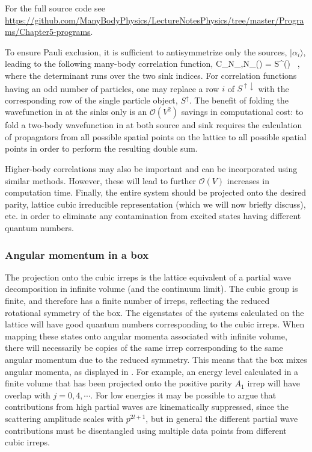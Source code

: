 For the full source code see \url{https://github.com/ManyBodyPhysics/LectureNotesPhysics/tree/master/Programs/Chapter5-programs}.


To ensure Pauli exclusion, it is sufficient to antisymmetrize only the sources, $|\alpha_i \rangle$, leading to the following many-body correlation function,
\beq
C_{N_{\uparrow},N_{\downarrow}}(\tau) = \langle \det S^{\uparrow \downarrow}(\tau) \rangle \ ,
\eeq 
where the determinant runs over the two sink indices. For correlation functions having an odd number of particles, one may replace a row $i$ of $S^{\uparrow\downarrow}$ with the corresponding row of the single particle object, $S^{\uparrow}$. The benefit of folding the wavefunction in at the sinks only is an ${\mathcal{ O}}(V^2)$ savings in computational cost: to fold a two-body wavefunction in at both source and sink requires the calculation of propagators from all possible spatial points on the lattice to all possible spatial points in order to perform the resulting double sum. 

Higher-body correlations may also be important and can be incorporated using similar methods. However, these will lead to further ${\mathcal{ O}}(V)$ increases in computation time. Finally, the entire system should be projected onto the desired parity, lattice cubic irreducible representation (which we will now briefly discuss), etc. in order to eliminate any contamination from excited states having different quantum numbers. 

\subsubsection{Angular momentum in a box}

The projection onto the cubic irreps is the lattice equivalent of a partial wave decomposition in infinite volume (and the continuum limit). The cubic group is finite, and therefore has a finite number of irreps, reflecting the reduced rotational symmetry of the box. The eigenstates of the systems calculated on the lattice will have good quantum numbers corresponding to the cubic irreps. When mapping these states onto angular momenta associated with infinite volume, there will necessarily be copies of the same irrep corresponding to the same angular momentum due to the reduced symmetry. This means that the box mixes angular momenta, as displayed in . For example, an energy level calculated in a finite volume that has been projected onto the positive parity $A_1$ irrep will have overlap with $j=0,4,\cdots$. For low energies it may be possible to argue that contributions from high partial waves are kinematically suppressed, since the scattering amplitude scales with $p^{2l+1}$, but in general the different partial wave contributions must be disentangled using multiple data points from different cubic irreps. 

